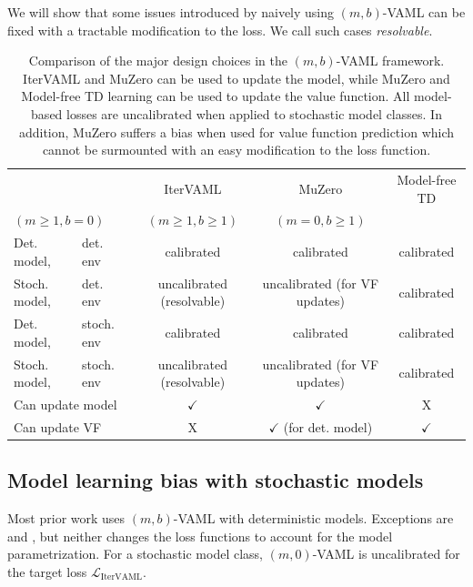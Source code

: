We will show that some issues introduced by naively using $(m,b)$-VAML can be fixed with a tractable modification to the loss.
We call such cases \emph{resolvable}.


\begin{table}
{\footnotesize
\centering
    \begin{tabular}{l l|c|c|c}
        && IterVAML &  MuZero &  Model-free TD \\
        \multicolumn{2}{l|}{$(m\geq1,b=0)$} &  $(m\geq1,b\geq1)$& $(m=0,b\geq1)$\\\hline
        Det. model,& det. env & {\color{newbluedeal} calibrated} & {\color{newbluedeal} calibrated} & {\color{newbluedeal} calibrated} \\
        Stoch. model,& det. env & {\color{newgreendeal} uncalibrated (resolvable)} & {\color{uoftred} uncalibrated (for VF updates)} & {\color{newbluedeal} calibrated}\\
        Det. model,& stoch. env & {\color{newbluedeal} calibrated} & {\color{newbluedeal} calibrated}  & {\color{newbluedeal} calibrated} \\
        Stoch. model,& stoch. env & {\color{newgreendeal} uncalibrated (resolvable)} & {\color{uoftred} uncalibrated (for VF updates)} & {\color{newbluedeal} calibrated} \\\hline
        \multicolumn{2}{l|}{Can update model} & {\color{newbluedeal} $\checkmark$} & {\color{newbluedeal} $\checkmark$}& \color{uoftred} X \\
        \multicolumn{2}{l|}{Can update VF}   & \color{uoftred} X & {\color{newgreendeal} $\checkmark$ (for det. model)}  & {\color{newbluedeal} $\checkmark$}
    \end{tabular}}
    \caption{Comparison of the major design choices in the $(m,b)$-VAML framework. IterVAML and MuZero can be used to update the model, while MuZero and Model-free TD learning can be used to update the value function. All model-based losses are uncalibrated when applied to stochastic model classes. In addition, MuZero suffers a bias when used for value function prediction which cannot be surmounted with an easy modification to the loss function.}
    \label{tab:bias_overview}
\end{table}

\subsection{Model learning bias with stochastic models}

Most prior work uses $(m,b)$-VAML with deterministic models.
Exceptions are \textcite{voelcker2022value} and \textcite{antonoglou2022planning}, but neither changes the loss functions to account for the model parametrization.
For a stochastic model class, $(m,0)$-VAML is uncalibrated for the target loss $\mathcal{L}_\mathrm{IterVAML}$.

